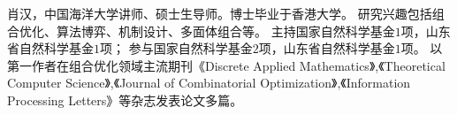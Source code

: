%
%

\par{
\fontsize{9.65pt}{\baselineskip}\selectfont
肖汉，中国海洋大学讲师、硕士生导师。博士毕业于香港大学。
研究兴趣包括组合优化、算法博弈、机制设计、多面体组合等。
主持国家自然科学基金$1$项，山东省自然科学基金$1$项；
参与国家自然科学基金$2$项，山东省自然科学基金$1$项。
以第一作者在组合优化领域主流期刊《Discrete Applied Mathematics》,《Theoretical Computer Science》,《Journal of Combinatorial Optimization》,《Information Processing Letters》等杂志发表论文多篇。
}